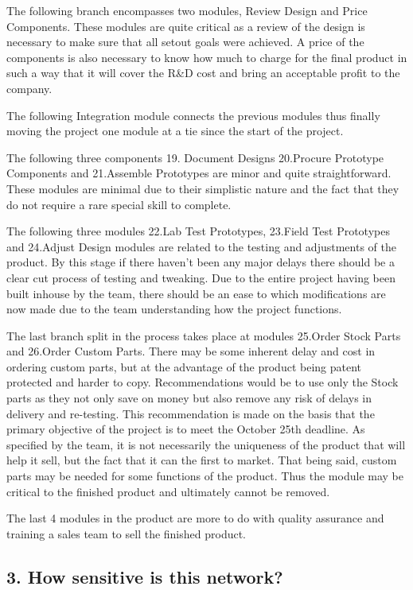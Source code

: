 \documentclass{article}
\begin{document}
The following branch encompasses two modules, Review Design and Price Components. These modules are quite critical as a review of the design is necessary to make sure that all setout goals were achieved. A price of the components is also necessary to know how much to charge for the final product in such a way that it will cover the R\&D cost and bring an acceptable profit to the company.


The following Integration module connects the previous modules thus finally moving the project one module at a tie since the start of the project.


The following three components 19. Document Designs 20.Procure Prototype Components  and 21.Assemble Prototypes are minor and quite straightforward. These modules are minimal due to their simplistic nature and the fact that they do not require a rare special skill to complete.


The following three modules 22.Lab Test Prototypes, 23.Field Test Prototypes and 24.Adjust Design modules are related to the testing and adjustments of the product. By this stage if there haven't been any major delays there should be a clear cut process of testing and tweaking. Due to the entire project having been built inhouse by the team, there should be an ease to which modifications are now made due to the team understanding how the project functions.


The last branch split in the process takes place at modules 25.Order Stock Parts and 26.Order Custom Parts. There may be some inherent delay and cost in ordering custom parts, but at the advantage of the product being patent protected and harder to copy. Recommendations would be to use only the Stock parts as they not only save on money but also remove any risk of delays in delivery and re-testing. This recommendation is made on the basis that the primary objective of the project is to meet the October 25th deadline. As specified by the team, it is not necessarily the uniqueness of the product that will help it sell, but the fact that it can  the first to market. That being said, custom parts may be needed for some functions of the product. Thus the module may be critical to the finished product and ultimately cannot be removed.


The last 4 modules in the product are more to do with quality assurance and training a sales team to sell the finished product. 




\subsection{3. How sensitive is this network?}
\end{document}
